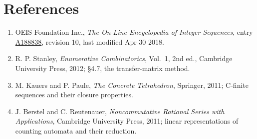 \documentclass[11pt]{article}
\theoremstyle{definition}
\begin{document}
\section{References}

\begin{enumerate}

\item OEIS Foundation Inc., \emph{The On-Line Encyclopedia of Integer Sequences}, entry \href{https://oeis.org/A188838}{A188838}, revision 10, last modified Apr 30 2018.

\item R. P. Stanley, \emph{Enumerative Combinatorics}, Vol.~1, 2nd ed., Cambridge University Press, 2012; \S4.7, the transfer-matrix method.

\item M. Kauers and P. Paule, \emph{The Concrete Tetrahedron}, Springer, 2011; C-finite sequences and their closure properties.

\item J. Berstel and C. Reutenauer, \emph{Noncommutative Rational Series with Applications}, Cambridge University Press, 2011; linear representations of counting automata and their reduction.

\end{enumerate}
\end{document}
